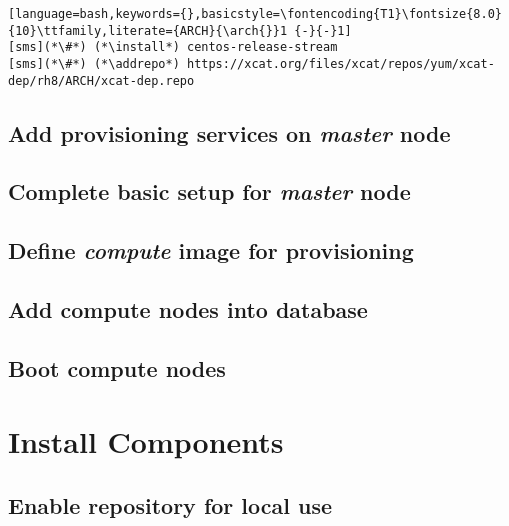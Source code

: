 \documentclass[letterpaper]{article}
\newcommand{\arch}{x86\_64}
\newcommand{\addrepo}{wget -P /etc/yum.repos.d}
\newcommand{\install}{dnf -y install}
\begin{document}
\begin{lstlisting}[language=bash,keywords={},basicstyle=\fontencoding{T1}\fontsize{8.0}{10}\ttfamily,literate={ARCH}{\arch{}}1 {-}{-}1]
[sms](*\#*) (*\install*) centos-release-stream
[sms](*\#*) (*\addrepo*) https://xcat.org/files/xcat/repos/yum/xcat-dep/rh8/ARCH/xcat-dep.repo
\end{lstlisting}

\subsection{Add provisioning services on {\em master} node} \label{sec:add_provisioning}

%

\vspace*{-0.15cm}
\subsection{Complete basic \xCAT{} setup for {\em master} node} \label{sec:setup_xcat}



\subsection{Define {\em compute} image for provisioning}


\clearpage
\subsection{Add compute nodes into \xCAT{} database} \label{sec:xcat_add_nodes}


\subsection{Boot compute nodes} \label{sec:boot_computes}


\section{Install \OHPC{} Components} \label{sec:basic_install}



\subsection{Enable \OHPC{} repository for local use} \label{sec:enable_repo}

\end{document}
